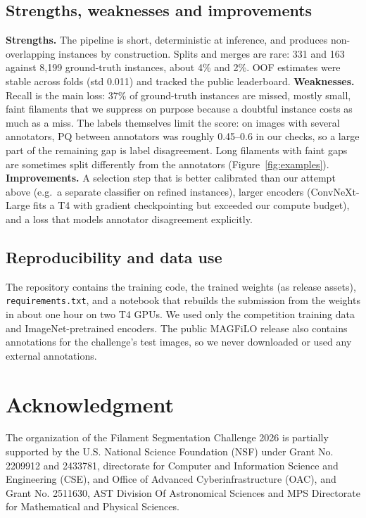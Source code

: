 \documentclass[sigconf]{acmart}
\begin{document}
\subsection{Strengths, weaknesses and improvements}
    \textbf{Strengths.} The pipeline is short, deterministic at inference, and produces non-overlapping instances by construction. Splits and merges are rare: 331 and 163 against 8,199 ground-truth instances, about 4\% and 2\%. OOF estimates were stable across folds (std 0.011) and tracked the public leaderboard.
    \textbf{Weaknesses.} Recall is the main loss: 37\% of ground-truth instances are missed, mostly small, faint filaments that we suppress on purpose because a doubtful instance costs as much as a miss. The labels themselves limit the score: on images with several annotators, PQ between annotators was roughly 0.45--0.6 in our checks, so a large part of the remaining gap is label disagreement. Long filaments with faint gaps are sometimes split differently from the annotators (Figure~\ref{fig:examples}).
    \textbf{Improvements.} A selection step that is better calibrated than our attempt above (e.g.\ a separate classifier on refined instances), larger encoders (ConvNeXt-Large fits a T4 with gradient checkpointing but exceeded our compute budget), and a loss that models annotator disagreement explicitly.

\subsection{Reproducibility and data use}
    The repository contains the training code, the trained weights (as release assets), \texttt{requirements.txt}, and a notebook that rebuilds the submission from the weights in about one hour on two T4 GPUs. We used only the competition training data and ImageNet-pretrained encoders. The public MAGFiLO release also contains annotations for the challenge's test images, so we never downloaded or used any external annotations.

\section{Acknowledgment}\label{sec:acknowledgment}
    The organization of the Filament Segmentation Challenge 2026 is partially supported by the U.S. National Science Foundation (NSF) under Grant No. 2209912 and 2433781, directorate for Computer and Information Science and Engineering (CSE), and Office of Advanced Cyberinfrastructure (OAC), and Grant No. 2511630, AST Division Of Astronomical Sciences and MPS Directorate for Mathematical and Physical Sciences.
\end{document}
